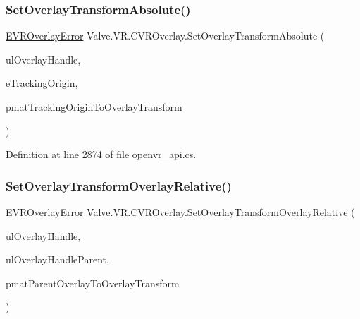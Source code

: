 \subsubsection{\texorpdfstring{SetOverlayTransformAbsolute()}{SetOverlayTransformAbsolute()}}
{\footnotesize\ttfamily \mbox{\hyperlink{namespace_valve_1_1_v_r_aaee5c5144f42b7969d45b854f51b0c18}{E\+V\+R\+Overlay\+Error}} Valve.\+V\+R.\+C\+V\+R\+Overlay.\+Set\+Overlay\+Transform\+Absolute (\begin{DoxyParamCaption}\item[{ulong}]{ul\+Overlay\+Handle,  }\item[{\mbox{\hyperlink{namespace_valve_1_1_v_r_a29be99a3c2f780157bd490db06a7f12f}{E\+Tracking\+Universe\+Origin}}}]{e\+Tracking\+Origin,  }\item[{ref \mbox{\hyperlink{struct_valve_1_1_v_r_1_1_hmd_matrix34__t}{Hmd\+Matrix34\+\_\+t}}}]{pmat\+Tracking\+Origin\+To\+Overlay\+Transform }\end{DoxyParamCaption})}



Definition at line 2874 of file openvr\+\_\+api.\+cs.

\mbox{\label{class_valve_1_1_v_r_1_1_c_v_r_overlay_a0e7a0d1d21be7f81f87f5456793024d8}} 
\subsubsection{\texorpdfstring{SetOverlayTransformOverlayRelative()}{SetOverlayTransformOverlayRelative()}}
{\footnotesize\ttfamily \mbox{\hyperlink{namespace_valve_1_1_v_r_aaee5c5144f42b7969d45b854f51b0c18}{E\+V\+R\+Overlay\+Error}} Valve.\+V\+R.\+C\+V\+R\+Overlay.\+Set\+Overlay\+Transform\+Overlay\+Relative (\begin{DoxyParamCaption}\item[{ulong}]{ul\+Overlay\+Handle,  }\item[{ulong}]{ul\+Overlay\+Handle\+Parent,  }\item[{ref \mbox{\hyperlink{struct_valve_1_1_v_r_1_1_hmd_matrix34__t}{Hmd\+Matrix34\+\_\+t}}}]{pmat\+Parent\+Overlay\+To\+Overlay\+Transform }\end{DoxyParamCaption})}



